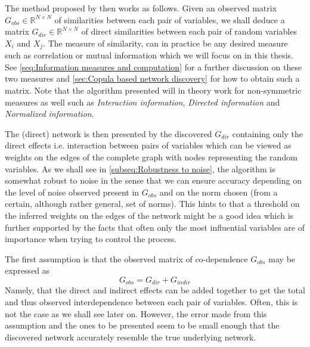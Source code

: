\documentclass[../Thesis.tex]{subfiles}
\begin{document}
The method proposed by \cite{Network-deconvolution-as-a-general-method-to-distinguish-direct-dependencies-in-networks} then works as follows. Given an observed matrix $G_{obs} \in \mathbb{R}^{N \times N}$ of similarities between each pair of variables, we shall deduce a matrix $G_{dir} \in \mathbb{R}^{N \times N}$ of direct similarities between each pair of random variables $X_i$ and $X_j$. The measure of similarity, can in practice be any desired measure such as correlation or mutual information which we will focus on in this thesis. See \autoref{seq:Information measures and computation} for a further discussion on these two measures and \autoref{sec:Copula based network discovery} for how to obtain such a matrix. Note that the algorithm presented will in theory work for non-symmetric measures as well such as \textit{Interaction information}, \textit{Directed information} and \textit{Normalized information}.

The (direct) network is then presented by the discovered $G_{dir}$ containing only the direct effects i.e. interaction between pairs of variables which can be viewed as weights on the edges of the complete graph with nodes representing the random variables. As we shall see in \autoref{subseq:Robustness to noise}, the algorithm is somewhat robust to noise in the sense that we can ensure accuracy depending on the level of noise observed present in $G_{obs}$ and on the norm chosen (from a certain, although rather general, set of norms). This hints to that a threshold on the inferred weights on the edges of the network might be a good idea which is further supported by the facts that often only the most influential variables are of importance when trying to control the process.

The first assumption is that the observed matrix of co-dependence $G_{obs}$ may be expressed as
\begin{equation}
    G_{obs} = G_{dir} + G_{indir}
\end{equation}
Namely, that the direct and indirect effects can be added together to get the total and thus observed interdependence between each pair of variables. Often, this is not the case as we shall see later on. However, the error made from this assumption and the ones to be presented seem to be small enough that the discovered network accurately resemble the true underlying network.
\end{document}
